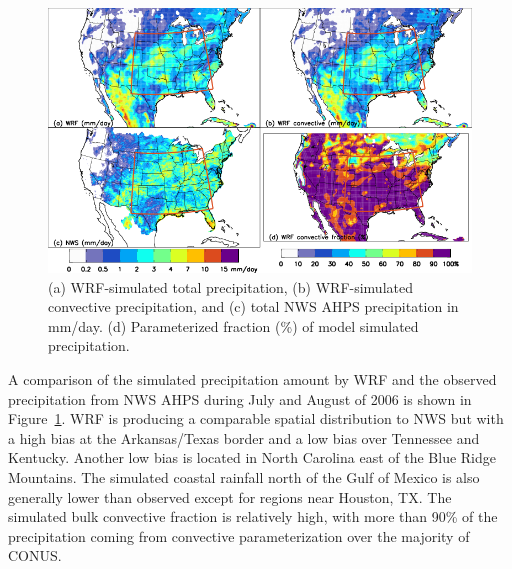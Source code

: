  \begin{figure}
 \noindent\includegraphics[width=40pc]{figures/precip_sd.png}
 \caption{(a) WRF-simulated total precipitation, (b) WRF-simulated convective precipitation, and
(c) total NWS AHPS precipitation in mm/day. (d) Parameterized fraction (\%) of model simulated
precipitation.}
 \label{fig:precip_sd}
 \end{figure}

A comparison of the simulated precipitation amount by WRF and
the observed precipitation from NWS AHPS during July and August of 2006 is shown in Figure~\ref{fig:precip_sd}.
WRF is producing a comparable spatial distribution to NWS but with a high bias at the
Arkansas/Texas border and a low bias over Tennessee and Kentucky. Another low bias
is located in North Carolina east of the Blue Ridge Mountains. The simulated coastal
rainfall north of the Gulf of Mexico is also generally lower than observed except for regions
near Houston, TX. The simulated bulk convective fraction is relatively
high, with more than 90\% of the precipitation coming from convective parameterization
over the majority of CONUS.

